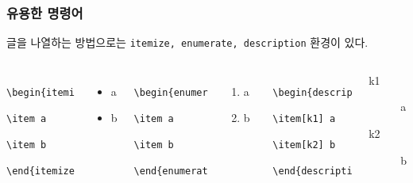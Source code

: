 \begin{frame}[fragile]
    \frametitle{유용한 명령어}

    글을 나열하는 방법으로는 \texttt{itemize, enumerate, description} 환경이 있다.

    \begin{columns}
        \begin{verbatim}
            \begin{itemize}
                \item a
                \item b
            \end{itemize}
        \end{verbatim}

        \begin{itemize}
            \item a
            \item b
        \end{itemize}

        \begin{verbatim}
            \begin{enumerate}
                \item a
                \item b
            \end{enumerate}
        \end{verbatim}

        \begin{enumerate}
            \item a
            \item b
        \end{enumerate}

        \begin{verbatim}
            \begin{description}
                \item[k1] a
                \item[k2] b
            \end{description}
        \end{verbatim}

        \begin{description}
            \item[k1] a
            \item[k2] b
        \end{description}
    \end{columns}

\end{frame}

